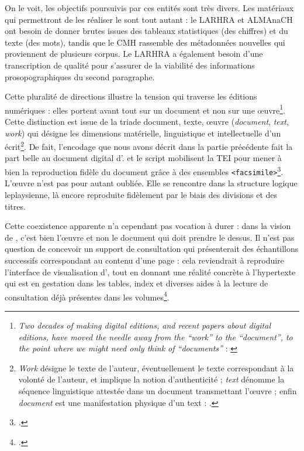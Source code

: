 On le voit, les objectifs poursuivis par ces entités sont très divers. Les matériaux qui permettront de les réaliser le sont tout autant : le LARHRA et ALMAnaCH ont besoin de donner brutes issues des tableaux statistiques (des chiffres) et du texte (des mots), tandis que le CMH rassemble des métadonnées nouvelles qui proviennent de plusieurs corpus. Le LARHRA a également besoin d'une transcription de qualité pour s'assurer de la viabilité des informations prosopographiques du second paragraphe.

Cette pluralité de directions illustre la tension qui traverse les éditions numériques : elles portent avant tout sur un document et non sur une \oe{}uvre\footnote{\og \textit{Two decades of making digital editions, and recent papers about digital editions, have moved the needle away from the “work” to the “document”, to the point where we might need only think of “documents”} \fg{} : \cite[p. 107]{robinson}}. Cette distinction est issue de la triade document, texte, \oe{}uvre (\textit{document}, \textit{text}, \textit{work}) qui désigne les dimensions matérielle, linguistique et intellectuelle d'un écrit\footnote{\og \textit{Work} désigne le texte de l’auteur, éventuellement le texte correspondant à la volonté de l’auteur, et implique la notion d’authenticité ; \textit{text} dénomme la séquence linguistique attestée dans un document transmettant l’œuvre ; enfin \textit{document} est une manifestation physique d’un text \fg{} : \cite[p. 15-16]{duval}.}. De fait, l'encodage que nous avons décrit dans la partie précédente fait la part belle au document digital \odm{} d'\ia. \transkribus{} et le script \lse{} mobilisent la TEI pour mener à bien la reproduction fidèle du document grâce à des ensembles \texttt{<facsimile>}\footcite[p. 124]{robinson}. L'\oe{}uvre n'est pas pour autant oubliée. Elle se rencontre dans la structure logique leplaysienne, là encore reproduite fidèlement par le biais des divisions et des titres.

Cette coexistence apparente n'a cependant pas vocation à durer : dans la vision de \timeus, c'est bien l'\oe{}uvre et non le document qui doit prendre le dessus. Il n'est pas question de concevoir un support de consultation qui présenterait des échantillons successifs correspondant au contenu d'une page : cela reviendrait à reproduire l'interface de visualisation d'\ia, tout en donnant une réalité concrète à l'hypertexte qui est \og en gestation dans les tables, index et diverses aides à la lecture de consultation déjà présentes \fg{} dans les volumes\footcite[p. 19]{duval}.

